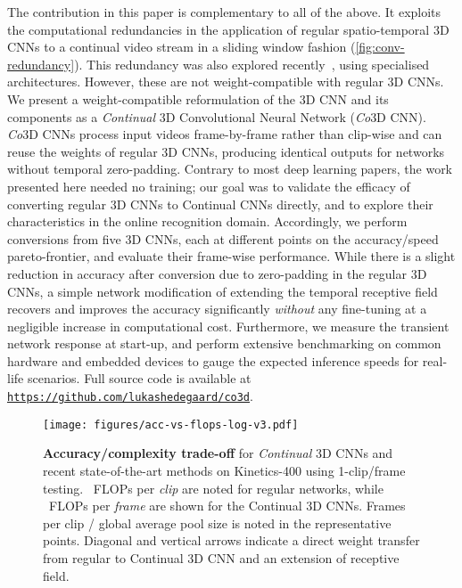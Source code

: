 \documentclass[runningheads]{llncs}
\begin{document}
The contribution in this paper is complementary to all of the above. It exploits the computational redundancies in the application of regular spatio-temporal 3D CNNs to a continual video stream in a sliding window fashion (\cref{fig:conv-redundancy}).
This redundancy was also explored recently~\cite{kopuklu2020dissected}, \cite{singh2019recurrent} using specialised architectures. However, these are not weight-compatible with regular 3D CNNs.
We present a weight-compatible reformulation of the 3D CNN and its components as a \mbox{\textit{Continual}} 3D Convolutional Neural Network (\textit{Co}3D CNN).
\textit{Co}3D CNNs process input videos frame-by-frame rather than clip-wise and can reuse the weights of regular 3D CNNs, producing identical outputs for networks without temporal zero-padding. 
Contrary to most deep learning papers, the work presented here needed no training; our goal was to validate the efficacy of converting regular 3D CNNs to Continual CNNs directly, and to explore their characteristics in the online recognition domain.
Accordingly, 
we perform conversions from five 3D CNNs, each at different points on the accuracy/speed pareto-frontier, and evaluate their frame-wise performance.
While there is a slight reduction in accuracy after conversion due to zero-padding in the regular 3D CNNs, a simple network modification of extending the temporal receptive field recovers and improves the accuracy significantly \textit{without} any fine-tuning at a negligible increase in computational cost.
Furthermore, we measure the transient network response at start-up, and perform extensive benchmarking on common hardware and embedded devices to gauge the expected inference speeds for real-life scenarios.
Full source code is available at \texttt{\url{https://github.com/lukashedegaard/co3d}}.











\begin{figure}
    \centering
    \texttt{[image: figures/acc-vs-flops-log-v3.pdf]}
    \caption{
        \textbf{Accuracy/complexity trade-off} for \textit{Continual} 3D CNNs and recent state-of-the-art methods on Kinetics-400 using 1-clip/frame testing. 
        ~FLOPs per \textit{clip} are noted for regular networks, while ~FLOPs per \textit{frame} are shown for the Continual 3D CNNs. 
Frames per clip / global average pool size is noted in the representative points.
        Diagonal and vertical arrows indicate a direct weight transfer from regular to Continual 3D CNN and an extension of receptive field.
    }
\label{fig:test-acc-vs-flops}
\end{figure} \vspace{-5pt}
\end{document}

